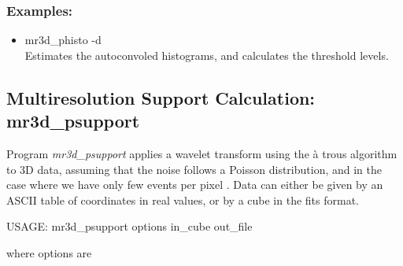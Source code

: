 \subsubsection*{Examples:}
\begin{itemize}
\item mr3d\_phisto -d \\
Estimates the autoconvoled histograms, and calculates the threshold levels.
\end{itemize}


\subsection{Multiresolution Support Calculation: mr3d\_psupport}
\label{sect_event3D}
Program 
{\em mr3d\_psupport} applies a wavelet transform using the \`a trous
algorithm to 3D data, assuming that the noise follows a Poisson distribution,
and in the case where we have only few events per pixel \cite{starck:book02}.
Data can either be given by an ASCII table of coordinates in real values, or
by a cube in the fits format.  
{\bf
\begin{center}
 USAGE: mr3d\_psupport options  in\_cube  out\_file
\end{center}}
where options are 
